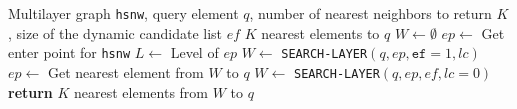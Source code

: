 \begin{algorithm}[H]
\caption{K-ANN-SEARCH(\texttt{hsnw}, $q$, $K$, $ef$)}
\begin{algorithmic}[1]
\Require Multilayer graph \texttt{hsnw}, query element $q$, number of nearest neighbors to return $K$, size of the dynamic candidate list $ef$
\Ensure $K$ nearest elements to $q$
\State $W \gets \emptyset$ 
\State $ep \gets$ Get enter point for \texttt{hsnw}
\State $L \gets$ Level of $ep$ 
    \State $W \gets$ \texttt{SEARCH-LAYER}$(q, ep, \texttt{ef}=1, lc)$
    \State $ep \gets$ Get nearest element from $W$ to $q$
\EndFor
\State $W \gets$ \texttt{SEARCH-LAYER}$(q, ep, ef, lc=0)$
\State \textbf{return} $K$ nearest elements from $W$ to $q$
\end{algorithmic}
\end{algorithm}
